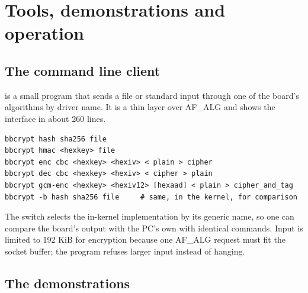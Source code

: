 \chapter{Tools, demonstrations and operation}\label{ch:tools}

\section{The command line client}

 is a small program that sends a file or standard input through one of the board's algorithms by driver name. It is a thin layer over AF\_ALG and shows the interface in about 260 lines.

\begin{lstlisting}[style=shell]
bbcrypt hash sha256 file
bbcrypt hmac <hexkey> file
bbcrypt enc cbc <hexkey> <hexiv> < plain > cipher
bbcrypt dec cbc <hexkey> <hexiv> < cipher > plain
bbcrypt gcm-enc <hexkey> <hexiv12> [hexaad] < plain > cipher_and_tag
bbcrypt -b hash sha256 file     # same, in the kernel, for comparison
\end{lstlisting}

The  switch selects the in-kernel implementation by its generic name, so one can compare the board's output with the PC's own with identical commands. Input is limited to 192 KiB for encryption because one AF\_ALG request must fit the socket buffer; the program refuses larger input instead of hanging.

\section{The demonstrations}

